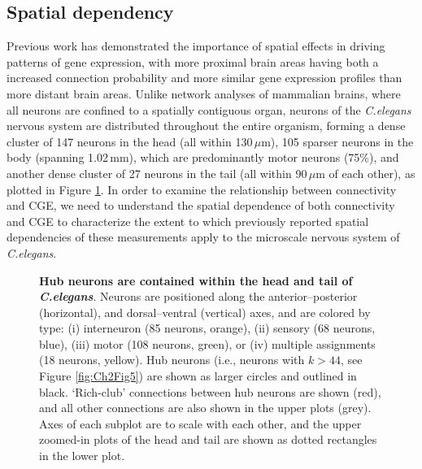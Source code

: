 \subsection{Spatial dependency}
Previous work has demonstrated the importance of spatial effects in driving patterns of gene expression, with more proximal brain areas
\citep{Horvat2016,Wang2016,Markov2013,Henderson2014,Fulcher2016,Noori2017,Levy2012,Azulay2016} having both a increased connection probability and more similar gene expression profiles \citep{Krienen2016, Fulcher2016, Pantazatos2017, Richiardi2017} than more distant brain areas.
Unlike network analyses of mammalian brains, where all neurons are confined to a spatially contiguous organ, neurons of the \emph{C.elegans} nervous system are distributed throughout the entire organism, forming a dense cluster of 147 neurons in the head (all within 130\,$\mu$m), 105 sparser neurons in the body (spanning 1.02\,mm), which are predominantly motor neurons (75\%), and another dense cluster of 27 neurons in the tail (all within 90\,$\mu$m of each other), as plotted in Figure \ref{fig:Ch2Fig2}.
In order to examine the relationship between connectivity and CGE, we need to understand the spatial dependence of both connectivity and CGE to characterize the extent to which previously reported spatial dependencies of these measurements apply to the microscale nervous system of \emph{C.elegans}.

\begin{figure}[h]
\caption{\textbf{Hub neurons are contained within the head and tail of \emph{C.elegans}}.
Neurons are positioned along the anterior--posterior (horizontal), and dorsal--ventral (vertical) axes, and are colored by type:
(i) interneuron (85 neurons, orange),
(ii) sensory (68 neurons, blue),
(iii) motor (108 neurons, green), or
(iv) multiple assignments (18 neurons, yellow).
Hub neurons (i.e., neurons with $k > 44$, see Figure \ref{fig:Ch2Fig5}) are shown as larger circles and outlined in black.
`Rich-club' connections between hub neurons are shown (red), and all other connections are also shown in the upper plots (grey).
Axes of each subplot are to scale with each other, and the upper zoomed-in plots of the head and tail are shown as dotted rectangles in the lower plot.}
\label{fig:Ch2Fig2}
\end{figure}

